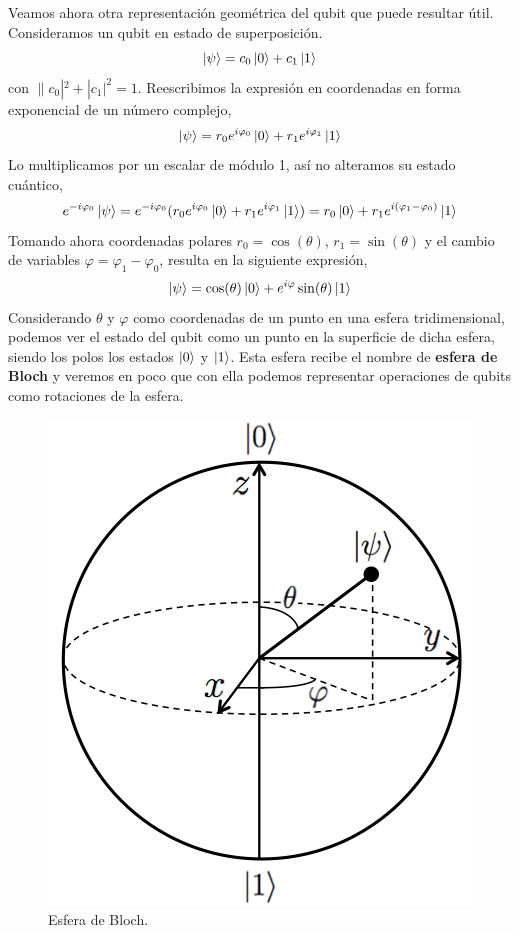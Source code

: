 \documentclass[a4paper]{article}
\numberwithin{equation}{section}
\begin{document}
Veamos ahora otra representación geométrica del qubit que puede resultar útil. Consideramos un qubit en estado de superposición.
\begin{equation}
\ket{\psi} = c_0\ket{0} + c_1\ket{1} 
\end{equation}
con $\|c_0|^2 + |c_1|^2 = 1$. Reescribimos la expresión en coordenadas en forma exponencial de un número complejo,
\begin{equation}
\ket{\psi} = r_0 e^{i\varphi_0}\ket{0} + r_1 e^{i\varphi_1}\ket{1}
\end{equation}
Lo multiplicamos por un escalar de módulo 1, así no alteramos su estado cuántico,
\begin{equation}
e^{-i\varphi_0}\ket{\psi} = e^{-i\varphi_0}(r_0 e^{i\varphi_0}\ket{0} + r_1 e^{i\varphi_1}\ket{1}) = 
r_0\ket{0} + r_1 e^{i(\varphi_1 - \varphi_0)}\ket{1}
\end{equation}
Tomando ahora coordenadas polares $r_0 = \cos(\theta)$, $r_1 = \sin(\theta)$ y el cambio de variables $\varphi = \varphi_1 - \varphi_0$, resulta en la siguiente expresión,
\begin{equation}
\ket{\psi} = \cos(\theta)\ket{0} + e^{i\varphi}\sin(\theta)\ket{1}
\end{equation}
Considerando $\theta$ y $\varphi$ como coordenadas de un punto en una esfera tridimensional, podemos ver el estado del qubit como un punto en la superficie de dicha esfera, siendo los polos los estados $\ket{0}$ y $\ket{1}$. Esta esfera recibe el nombre de \textbf{esfera de Bloch} y veremos en poco que con ella podemos representar operaciones de qubits como rotaciones de la esfera.

\begin{figure}[h]
	\centering
	\includegraphics[scale=.3]{esfera_bloch}
	\caption{Esfera de Bloch.}
\end{figure}
\end{document}

